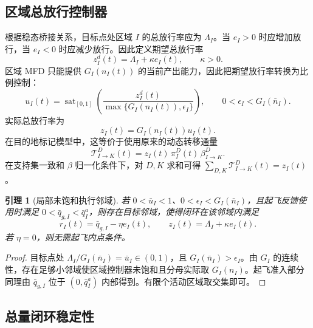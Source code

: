 \documentclass[a4paper,12pt]{article}
\theoremstyle{plain}
\newtheorem{lemma}[theorem]{引理}
\theoremstyle{definition}
\theoremstyle{remark}
\begin{document}
\subsection{区域总放行控制器}

根据稳态桥接关系，目标点处区域 $I$ 的总放行率应为 $\Lambda_I$。当 $e_I>0$ 时应增加放行，当 $e_I<0$ 时应减少放行。因此定义期望总放行率
\begin{equation}\label{eq:desired_release_v20}
    z_I^d(t)=\Lambda_I+\kappa e_I(t),
    \qquad \kappa>0.
\end{equation}
区域 MFD 只能提供 $G_I(n_I(t))$ 的当前产出能力，因此把期望放行率转换为比例控制：
\begin{equation}\label{eq:regional_controller_v20}
    u_I(t)=
    \operatorname{sat}_{[0,1]}
    \left(
    \frac{z_I^d(t)}
    {\max\{G_I(n_I(t)),\epsilon_I\}}
    \right),
    \qquad 0<\epsilon_I<G_I(\bar n_I).
\end{equation}
实际总放行率为
\begin{equation}\label{eq:release_rate_v20}
    z_I(t)=G_I(n_I(t))u_I(t).
\end{equation}
在目的地标记模型中，这等价于使用原来的动态转移通量
\begin{equation}\label{eq:controlled_transfer_flux_v20}
    \mathcal T_{I\to K}^D(t)
    =
    z_I(t)\,\pi_I^D(t)\,\beta_{I\to K}^D.
\end{equation}
在支持集一致和 $\beta$ 归一化条件下，对 $D,K$ 求和可得 $\sum_{D,K}\mathcal T_{I\to K}^D(t)=z_I(t)$。

\begin{lemma}[局部未饱和执行邻域]\label{lem:unsaturated_v20}
若 $0<\bar u_I<1$、$0<\epsilon_I<G_I(\bar n_I)$，且起飞反馈使用时满足 $0<\bar q_{g,I}<\bar q_I^a$，则存在目标邻域，使得闭环在该邻域内满足
\begin{equation}\label{eq:unsaturated_values_v20}
    r_I(t)=\bar q_{g,I}-\eta e_I(t),
    \qquad
    z_I(t)=\Lambda_I+\kappa e_I(t).
\end{equation}
若 $\eta=0$，则无需起飞内点条件。
\end{lemma}

\begin{proof}
目标点处 $\Lambda_I/G_I(\bar n_I)=\bar u_I\in(0,1)$，且 $G_I(\bar n_I)>\epsilon_I$。由 $G_I$ 的连续性，存在足够小邻域使区域控制器未饱和且分母实际取 $G_I(n_I)$。起飞准入部分同理由 $\bar q_{g,I}$ 位于 $(0,\bar q_I^a)$ 内部得到。有限个活动区域取交集即可。
\end{proof}

\subsection{总量闭环稳定性}
\end{document}
